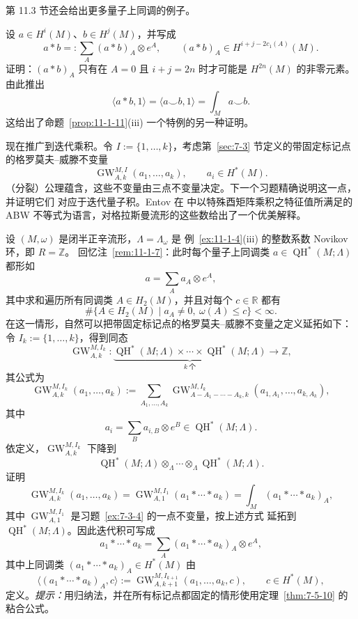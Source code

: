 第 11.3 节还会给出更多量子上同调的例子。

\begin{exercise}\label{ex:11-1-17}
设 $a\in H^i(M)$、$b\in H^j(M)$，并写成
\[
  a*b=:\sum_A(a*b)_A\otimes e^A,
  \qquad (a*b)_A\in H^{i+j-2c_1(A)}(M).
\]
证明：$(a*b)_A$ 只有在 $A=0$ 且 $i+j=2n$ 时才可能是 $H^{2n}(M)$ 的非零元素。由此推出
\[
  \langle a*b,1\rangle=\langle a\smile b,1\rangle
  =\int_Ma\smile b.
\]
这给出了命题~\ref{prop:11-1-11}(iii) 一个特例的另一种证明。
\end{exercise}

现在推广到迭代乘积。令 $I:=\{1,\ldots,k\}$，考虑第~\ref{sec:7-3} 节定义的带固定标记点
的格罗莫夫--威滕不变量
\[
  \operatorname{GW}_{A,k}^{M,I}(a_1,\ldots,a_k),
  \qquad a_i\in H^*(M).
\]
（分裂）公理蕴含，这些不变量由三点不变量决定。下一个习题精确说明这一点，并证明它们
对应于迭代量子积。Entov 在  中以特殊酉矩阵乘积之特征值所满足的 ABW
不等式为语言，对格拉斯曼流形的这些数给出了一个优美解释。

\begin{exercise}[迭代量子积]\label{ex:11-1-18}
设 $(M,\omega)$ 是闭半正辛流形，$\Lambda=\Lambda_\omega$ 是
例~\ref{ex:11-1-4}(iii) 的整数系数 Novikov 环，即 $R=\mathbb Z$。
回忆注~\ref{rem:11-1-7}：此时每个量子上同调类
$a\in\operatorname{QH}^*(M;\Lambda)$ 都形如
\[
  a=\sum_Aa_A\otimes e^A,
\]
其中求和遍历所有同调类 $A\in H_2(M)$，并且对每个 $c\in\mathbb R$ 都有
\[
  \#\{A\in H_2(M)\mid a_A\ne0,\ \omega(A)\le c\}<\infty.
\]
在这一情形，自然可以把带固定标记点的格罗莫夫--威滕不变量之定义延拓如下：令
$I_k:=\{1,\ldots,k\}$，得到同态
\[
  \operatorname{GW}_{A,k}^{M,I_k}:
  \underbrace{\operatorname{QH}^*(M;\Lambda)\times\cdots\times
  \operatorname{QH}^*(M;\Lambda)}_{k\ \text{个}}
  \longrightarrow\mathbb Z,
\]
其公式为
\[
  \operatorname{GW}_{A,k}^{M,I_k}(a_1,\ldots,a_k)
  :=\sum_{A_1,\ldots,A_k}
  \operatorname{GW}_{A-A_1-\cdots-A_k,k}^{M,I_k}
  (a_{1,A_1},\ldots,a_{k,A_k}),
\]
其中
\[
  a_i=\sum_Ba_{i,B}\otimes e^B\in\operatorname{QH}^*(M;\Lambda).
\]
依定义，$\operatorname{GW}_{A,k}^{M,I_k}$ 下降到
\[
  \operatorname{QH}^*(M;\Lambda)\otimes_\Lambda\cdots
  \otimes_\Lambda\operatorname{QH}^*(M;\Lambda).
\]
证明
\[
  \operatorname{GW}_{A,k}^{M,I_k}(a_1,\ldots,a_k)
  =\operatorname{GW}_{A,1}^{M,I_1}(a_1*\cdots*a_k)
  =\int_M(a_1*\cdots*a_k)_A,
\]
其中 $\operatorname{GW}_{A,1}^{M,I_1}$ 是习题~\ref{ex:7-3-4} 的一点不变量，按上述方式
延拓到 $\operatorname{QH}^*(M;\Lambda)$。因此迭代积可写成
\[
  a_1*\cdots*a_k=\sum_A(a_1*\cdots*a_k)_A\otimes e^A,
\]
其中上同调类 $(a_1*\cdots*a_k)_A\in H^*(M)$ 由
\[
  \langle(a_1*\cdots*a_k)_A,c\rangle
  :=\operatorname{GW}_{A,k+1}^{M,I_{k+1}}(a_1,\ldots,a_k,c),
  \qquad c\in H^*(M),
\]
定义。\emph{提示：}用归纳法，并在所有标记点都固定的情形使用定理~\ref{thm:7-5-10}
的粘合公式。
\end{exercise}

